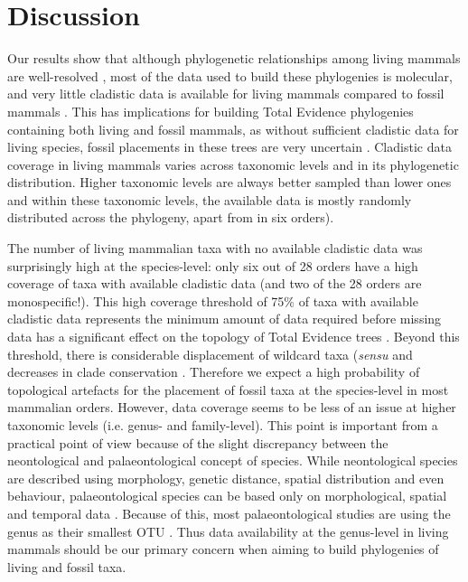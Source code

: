 %
%

\section{Discussion}
Our results show that although phylogenetic relationships among living mammals are well-resolved \citep[e.g.][]{BinindaEmonds,meredithimpacts2011} , most of the data used to build these phylogenies is molecular, and very little cladistic data is available for living mammals compared to fossil mammals \citep[e.g.][]{O'Leary08022013,ni2013oldest}.
This has implications for building Total Evidence phylogenies containing both living and fossil mammals, as without sufficient cladistic data for living species, fossil placements in these trees are very uncertain \citep{GuillermeCooper}.
Cladistic data coverage in living mammals varies across taxonomic levels and in its phylogenetic distribution.
Higher taxonomic levels are always better sampled than lower ones and within these taxonomic levels, the available data is mostly randomly distributed across the phylogeny, apart from in six orders).

The number of living mammalian taxa with no available cladistic data was surprisingly high at the species-level: only six out of 28 orders have a high coverage of taxa with available cladistic data (and two of the 28 orders are monospecific!).
This high coverage threshold of 75\% of taxa with available cladistic data represents the minimum amount of data required before missing data has a significant effect on the topology of Total Evidence trees \citep{GuillermeCooper}.
Beyond this threshold, there is considerable displacement of wildcard taxa (\textit{sensu} \citep{kearneyfragmentary2002} and decreases in clade conservation \citep{GuillermeCooper}.
Therefore we expect a high probability of topological artefacts for the placement of fossil taxa at the species-level in most mammalian orders.
However, data coverage seems to be less of an issue at higher taxonomic levels (i.e. genus- and family-level).
This point is important from a practical point of view because of the slight discrepancy between the neontological and palaeontological concept of species.
While neontological species are described using morphology, genetic distance, spatial distribution and even behaviour, palaeontological species can be based only on morphological, spatial and temporal data \citep[e.g.][]{ni2013oldest}.
Because of this, most palaeontological studies are using the genus as their smallest OTU \citep[e.g.][]{ni2013oldest,O'Leary08022013}.
Thus data availability at the genus-level in living mammals should be our primary concern when aiming to build phylogenies of living and fossil taxa.

